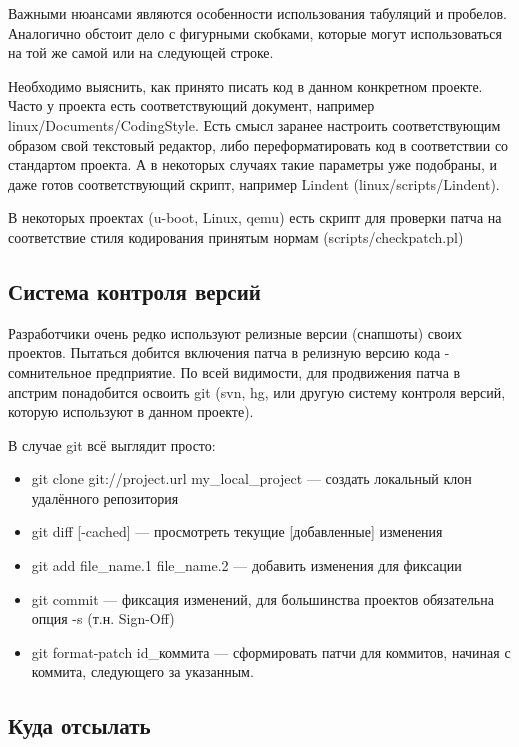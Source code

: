 \documentclass[10pt, a5paper]{article}
\begin{document}
Важными нюансами являются особенности использования табуляций и пробелов. Аналогично обстоит дело с фигурными скобками, которые могут использоваться на той же самой или на следующей строке.

Необходимо выяснить, как принято писать код в данном конкретном проекте. Часто у проекта есть соответствующий документ, например linux/Documents/CodingStyle. Есть смысл заранее настроить соответствующим образом свой текстовый редактор, либо переформатировать код в соответствии со стандартом проекта. А в некоторых случаях такие параметры уже подобраны, и даже готов соответствующий скрипт, например Lindent (linux/scripts/Lindent).

В некоторых проектах (u-boot, Linux, qemu) есть скрипт для проверки патча на соответствие стиля кодирования принятым нормам (scripts/checkpatch.pl)

\subsection*{Система контроля версий}

Разработчики очень редко используют релизные версии (снапшоты) своих проектов. Пытаться добится включения патча в релизную версию кода - сомнительное предприятие. По всей видимости, для продвижения патча в апстрим понадобится освоить git (svn, hg, или другую систему контроля версий, которую используют в данном проекте).

В случае git всё выглядит просто:

\begin{itemize}
  \item  git clone git://project.url my\_local\_project --- создать локальный клон удалённого репозитория
  \item  git diff [-cached] --- просмотреть текущие [добавленные] изменения
  \item  git add file\_name.1 file\_name.2 --- добавить изменения для фиксации
  \item  git commit --- фиксация изменений, для большинства проектов обязательна опция -s (т.н. Sign-Off)
  \item  git format-patch id\_коммита --- сформировать патчи для коммитов, начиная с коммита, следующего за указанным.
\end{itemize}

\subsection*{Куда отсылать}
\end{document}
